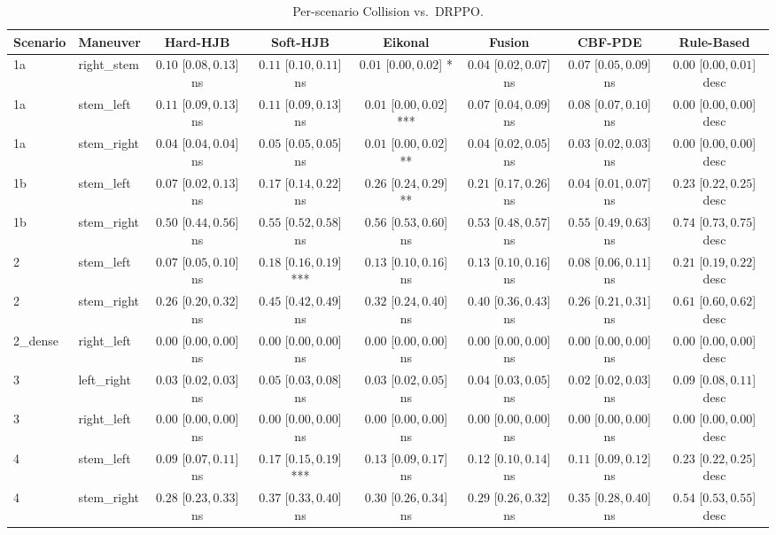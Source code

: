 \begin{table}[ht]
\centering
\caption{Per-scenario Collision vs.\ DRPPO.}
\label{tab:per_scenario_collision_rate}
\begin{tabular}{llcccccc}
\toprule
Scenario & Maneuver & Hard-HJB & Soft-HJB & Eikonal & Fusion & CBF-PDE & Rule-Based \\
\midrule
1a & right_stem & $0.10$ [$0.08, 0.13$] ns & $0.11$ [$0.10, 0.11$] ns & $0.01$ [$0.00, 0.02$] * & $0.04$ [$0.02, 0.07$] ns & $0.07$ [$0.05, 0.09$] ns & $0.00$ [$0.00, 0.01$] desc \\
1a & stem_left & $0.11$ [$0.09, 0.13$] ns & $0.11$ [$0.09, 0.13$] ns & $0.01$ [$0.00, 0.02$] *** & $0.07$ [$0.04, 0.09$] ns & $0.08$ [$0.07, 0.10$] ns & $0.00$ [$0.00, 0.00$] desc \\
1a & stem_right & $0.04$ [$0.04, 0.04$] ns & $0.05$ [$0.05, 0.05$] ns & $0.01$ [$0.00, 0.02$] ** & $0.04$ [$0.02, 0.05$] ns & $0.03$ [$0.02, 0.03$] ns & $0.00$ [$0.00, 0.00$] desc \\
1b & stem_left & $0.07$ [$0.02, 0.13$] ns & $0.17$ [$0.14, 0.22$] ns & $0.26$ [$0.24, 0.29$] ** & $0.21$ [$0.17, 0.26$] ns & $0.04$ [$0.01, 0.07$] ns & $0.23$ [$0.22, 0.25$] desc \\
1b & stem_right & $0.50$ [$0.44, 0.56$] ns & $0.55$ [$0.52, 0.58$] ns & $0.56$ [$0.53, 0.60$] ns & $0.53$ [$0.48, 0.57$] ns & $0.55$ [$0.49, 0.63$] ns & $0.74$ [$0.73, 0.75$] desc \\
2 & stem_left & $0.07$ [$0.05, 0.10$] ns & $0.18$ [$0.16, 0.19$] *** & $0.13$ [$0.10, 0.16$] ns & $0.13$ [$0.10, 0.16$] ns & $0.08$ [$0.06, 0.11$] ns & $0.21$ [$0.19, 0.22$] desc \\
2 & stem_right & $0.26$ [$0.20, 0.32$] ns & $0.45$ [$0.42, 0.49$] ns & $0.32$ [$0.24, 0.40$] ns & $0.40$ [$0.36, 0.43$] ns & $0.26$ [$0.21, 0.31$] ns & $0.61$ [$0.60, 0.62$] desc \\
2_dense & right_left & $0.00$ [$0.00, 0.00$] ns & $0.00$ [$0.00, 0.00$] ns & $0.00$ [$0.00, 0.00$] ns & $0.00$ [$0.00, 0.00$] ns & $0.00$ [$0.00, 0.00$] ns & $0.00$ [$0.00, 0.00$] desc \\
3 & left_right & $0.03$ [$0.02, 0.03$] ns & $0.05$ [$0.03, 0.08$] ns & $0.03$ [$0.02, 0.05$] ns & $0.04$ [$0.03, 0.05$] ns & $0.02$ [$0.02, 0.03$] ns & $0.09$ [$0.08, 0.11$] desc \\
3 & right_left & $0.00$ [$0.00, 0.00$] ns & $0.00$ [$0.00, 0.00$] ns & $0.00$ [$0.00, 0.00$] ns & $0.00$ [$0.00, 0.00$] ns & $0.00$ [$0.00, 0.00$] ns & $0.00$ [$0.00, 0.00$] desc \\
4 & stem_left & $0.09$ [$0.07, 0.11$] ns & $0.17$ [$0.15, 0.19$] *** & $0.13$ [$0.09, 0.17$] ns & $0.12$ [$0.10, 0.14$] ns & $0.11$ [$0.09, 0.12$] ns & $0.23$ [$0.22, 0.25$] desc \\
4 & stem_right & $0.28$ [$0.23, 0.33$] ns & $0.37$ [$0.33, 0.40$] ns & $0.30$ [$0.26, 0.34$] ns & $0.29$ [$0.26, 0.32$] ns & $0.35$ [$0.28, 0.40$] ns & $0.54$ [$0.53, 0.55$] desc \\
\bottomrule
\end{tabular}
\end{table}

